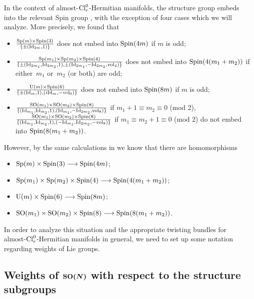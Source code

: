 \documentclass[pdftex]{sigma}
\numberwithin{equation}{section}
\begin{document}
In the context of almost-${\rm Cl}_r^0$-Hermitian manifolds, the structure group embeds into the relevant Spin group \cite[Theorem~4.1]{Arizmendi-Garcia-Herrera}, with the exception of four cases which we will analyze. More precisely, we found that
\begin{itemize}\itemsep=0pt
 \item ${{\rm Sp}(m)\times {\rm Spin}(3)\over \{\pm ({\rm Id}_{2m},1)\}}$ does not embed into ${\rm Spin}(4m)$ if $m$ is odd;
 \item ${{\rm Sp}(m_1)\times {\rm Sp}(m_2)\times {\rm Spin}(4)\over \{\pm ({\rm Id}_{2m_1},{\rm Id}_{2m_2},1),\pm ({\rm Id}_{2m_1},-{\rm Id}_{2m_2},{\rm vol}_4)\}}$ does not embed into ${\rm Spin}(4(m_1+m_2))$ if either~$m_1$ or~$m_2$ (or both) are odd;
 \item ${{\rm U}(m)\times {\rm Spin}(6)\over\{\pm ({\rm Id}_m,1),(i{\rm Id}_m, -{\rm vol}_6)\}}$ does not embed into
 ${\rm Spin}(8m)$ if $m$ is odd;
 \item ${{\rm SO}(m_1)\times {\rm SO}(m_2)\times {\rm Spin}(8)\over \{({\rm Id}_{m_1},{\rm Id}_{m_2},1),({\rm Id}_{m_1},-{\rm Id}_{2m_2},{\rm vol}_8)\}}$ if $m_1+1\equiv m_2\equiv 0$ (mod 2), %
 ${{\rm SO}(m_1)\times {\rm SO}(m_2)\times {\rm Spin}(8)\over \{({\rm Id}_{m_1},{\rm Id}_{m_2},1),(-{\rm Id}_{m_1},{\rm Id}_{2m_2},-{\rm vol}_8)\}}$ if $m_1\equiv m_2+1\equiv 0$ (mod 2)
 do not embed into ${\rm Spin}(8(m_1+m_2))$.
\end{itemize}
However, by the same calculations in \cite{Arizmendi-Garcia-Herrera} we know that there are homomorphisms
\begin{itemize}\itemsep=0pt
 \item ${\rm Sp}(m)\times {\rm Spin}(3)\longrightarrow {\rm Spin}(4m)$;
\item ${\rm Sp}(m_1)\times {\rm Sp}(m_2)\times {\rm Spin}(4)\longrightarrow {\rm Spin}(4(m_1+m_2))$;
\item ${\rm U}(m)\times {\rm Spin}(6)\longrightarrow {\rm Spin}(8m)$;
\item ${\rm SO}(m_1)\times {\rm SO}(m_2)\times {\rm Spin}(8)\longrightarrow {\rm Spin}(8(m_1+m_2))$.
\end{itemize}

In order to analyze this situation and the appropriate twisting bundles for almost-${\rm Cl}_r^0$-Hermitian manifolds in general, we need to set up some notation regarding weights of Lie groups.

\subsection[Weights of ${\rm SO}(N)$ with respect to the structure subgroups]{Weights of $\boldsymbol{{\rm SO}(N)}$ with respect to the structure subgroups}\label{subsec: weights}
\end{document}
